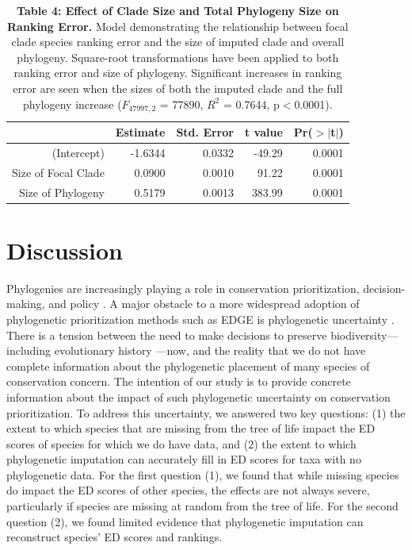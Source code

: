 \documentclass[12pt,english]{article}
\begin{document}
\begin{table}[ht]
  \centering
  \begin{tabular}{rrrrr}
    \hline
   & Estimate & Std. Error & t value & Pr($>$$|$t$|$) \\
    \hline
  (Intercept) & -1.6344 & 0.0332 & -49.29 & 0.0001 \\
    Size of Focal Clade & 0.0900 & 0.0010 & 91.22 & 0.0001 \\
    Size of Phylogeny & 0.5179 & 0.0013 & 383.99 & 0.0001 \\
     \hline
     \hline
  \end{tabular}
  \caption*{\textbf{Table 4: Effect of Clade Size and Total Phylogeny Size on
  Ranking Error.} Model demonstrating the relationship between focal clade
  species ranking error and the size of imputed clade and overall phylogeny.
  Square-root transformations have been applied to both ranking error and size
  of phylogeny. Significant increases in ranking error are seen when the sizes
  of both the imputed clade and the full phylogeny increase ($F_{47997, 2}$ =
  77890, $R^{2}$ = 0.7644, p$<$0.0001).}
  \end{table}

\clearpage
\section*{Discussion}
Phylogenies are increasingly playing a role in conservation prioritization,
decision-making, and policy \autocite{Vezquez1998}. A major obstacle to a more
widespread adoption of phylogenetic prioritization methods such as EDGE is
phylogenetic uncertainty \autocite{Collen2015}. There is a tension between the
need to make decisions to preserve biodiversity---including evolutionary history
---now, and the reality that we do not have complete information about the
phylogenetic placement of many species of conservation concern. The intention of
our study is to provide concrete information about the impact of such
phylogenetic uncertainty on conservation prioritization. To address this
uncertainty, we answered two key questions: (1) the extent to which species that
are missing from the tree of life impact the ED scores of species for which we
do have data, and (2) the extent to which phylogenetic imputation can accurately
fill in ED scores for taxa with no phylogenetic data. For the first question
(1), we found that while missing species do impact the ED scores of other
species, the effects are not always severe, particularly if species are missing
at random from the tree of life. For the second question (2), we found limited
evidence that phylogenetic imputation can reconstruct species' ED scores and
rankings.
\end{document}
